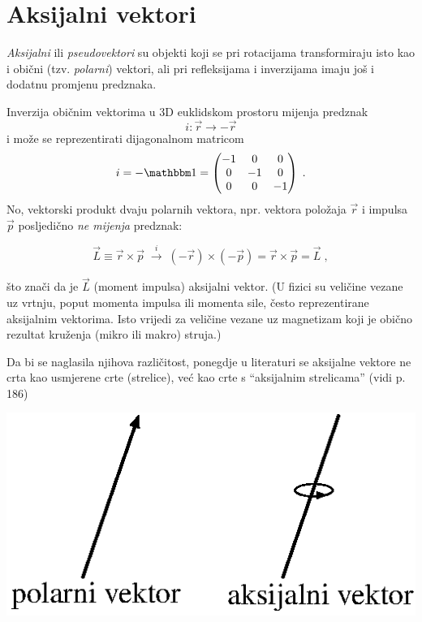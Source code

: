 \chapter{Aksijalni vektori}
\label{sec:aksijalni}

\emph{Aksijalni} ili \emph{pseudovektori} su objekti koji se pri rotacijama transformiraju
isto kao i obični (tzv. \emph{polarni}) vektori, ali pri refleksijama i inverzijama
imaju još i dodatnu promjenu predznaka.

Inverzija običnim vektorima u 3D euklidskom prostoru mijenja
predznak 
$$i: \vec{r} \to - \vec{r}$$ 
i može se reprezentirati dijagonalnom
matricom 
$$
i = -\Eins = 
\begin{pmatrix}
    -1 & 0 & 0 \\
    0 & -1 & 0 \\
    0 & 0 & -1
\end{pmatrix} \;.
$$
No, vektorski produkt dvaju polarnih vektora, npr. vektora položaja $\vec{r}$
i impulsa $\vec{p}$ posljedično \emph{ne mijenja} predznak:

\[  \vec{L}\equiv \vec{r}\times\vec{p} \; \stackrel{i}{\longrightarrow} \;
  (-\vec{r}) \times (-\vec{p}) =  \vec{r}\times\vec{p} = \vec{L}  \;,
\]

što znači da je $\vec{L}$ (moment impulsa) aksijalni vektor. (U fizici su
veličine vezane uz vrtnju, poput momenta impulsa ili momenta sile, 
često reprezentirane aksijalnim vektorima. Isto vrijedi za veličine
vezane uz magnetizam koji je obično rezultat kruženja (mikro ili makro) struja.)

Da bi se naglasila njihova različitost,
ponegdje u literaturi se aksijalne vektore ne crta kao usmjerene crte
(strelice), već kao crte s ``aksijalnim strelicama'' (vidi 
\cite{Bronstejn:2004} p. 186)

\centerline{\includegraphics[scale=0.8]{pics/aksijalni_vektor.eps}}


